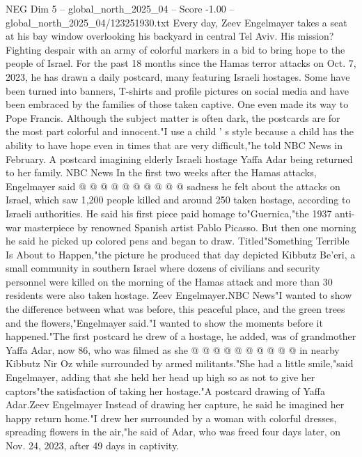 \begin{textsample}{NEG Dim 5 – global\_north\_2025\_04 – Score -1.00 – global\_north\_2025\_04/123251930.txt}  \label{ex:f5_neg_360}
Every day, Zeev Engelmayer takes a seat at his bay window overlooking his backyard in central Tel Aviv.
His mission?
Fighting despair with an army of colorful markers in a bid to bring hope to the people of Israel.
For the past 18 months since the Hamas terror attacks on Oct. 7, 2023, he has drawn a daily postcard, many featuring Israeli hostages.
Some have been turned into banners, T-shirts and profile pictures on social media and have been embraced by the families of those taken captive.
One even made its way to Pope Francis.
Although the subject matter is often dark, the postcards are for the most part colorful and innocent."I use a child ' s style because a child has the ability to have hope even in times that are very difficult,"he told NBC News in February.
A postcard imagining elderly Israeli hostage Yaffa Adar being returned to her family.
NBC News In the first two weeks after the Hamas attacks, Engelmayer said @ @ @ @ @ @ @ @ @ @ sadness he felt about the attacks on Israel, which saw 1,200 people killed and around 250 taken hostage, according to Israeli authorities.
He said his first piece paid homage to"Guernica,"the 1937 anti-war masterpiece by renowned Spanish artist Pablo Picasso.
But then one morning he said he picked up colored pens and began to draw.
Titled"Something Terrible Is About to Happen,"the picture he produced that day depicted Kibbutz Be'eri, a small community in southern Israel where dozens of civilians and security personnel were killed on the morning of the Hamas attack and more than 30 residents were also taken hostage.
Zeev Engelmayer.NBC News"I wanted to show the difference between what was before, this peaceful place, and the green trees and the flowers,"Engelmayer said."I wanted to show the moments before it happened."The first postcard he drew of a hostage, he added, was of grandmother Yaffa Adar, now 86, who was filmed as she @ @ @ @ @ @ @ @ @ @ in nearby Kibbutz Nir Oz while surrounded by armed militants."She had a little smile,"said Engelmayer, adding that she held her head up high so as not to give her captors"the satisfaction of taking her hostage."A postcard drawing of Yaffa Adar.Zeev Engelmayer Instead of drawing her capture, he said he imagined her happy return home."I drew her surrounded by a woman with colorful dresses, spreading flowers in the air,"he said of Adar, who was freed four days later, on Nov. 24, 2023, after 49 days in captivity.

\end{textsample}

